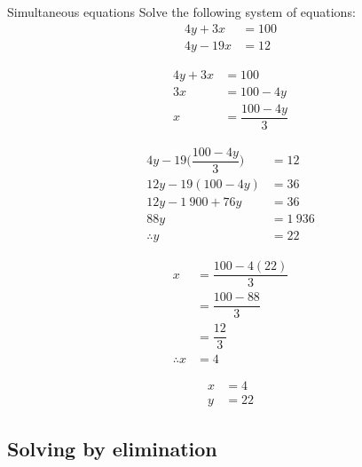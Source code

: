 \begin{wex}
{Simultaneous equations}
{
Solve the following system of equations:
\begin{align*}
  4y+3x &= 100 \\
  4y - 19x &= 12
\end{align*}
}
{
\begin{align*}
  4y+3x &= 100 \\
  3x &= 100 - 4y \\
  x &= \dfrac{100 - 4y}{3}
\end{align*}

\begin{align*}
  4y - 19\Big(\dfrac{100 - 4y}{3}\Big) &= 12 \\
  12y - 19(100 - 4y) &= 36 \\
  12y - 1~900 + 76y &= 36 \\
  88y &= 1~936 \\
  \therefore y &= 22
\end{align*}

\begin{align*}
  x &= \dfrac{100 - 4(22)}{3} \\
    &= \dfrac{100-88}{3} \\
    &= \dfrac{12}{3} \\
  \therefore x &= 4
\end{align*}


\begin{align*}
  x &= 4 \\
  y &= 22
\end{align*}
}
\end{wex}

\subsection*{Solving by elimination}

